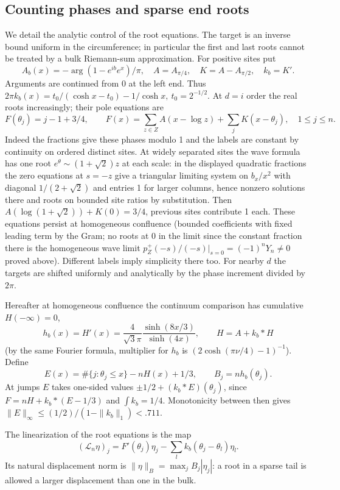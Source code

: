 \documentclass[11pt]{article}
\numberwithin{equation}{section}
\theoremstyle{definition}\newtheorem{definition}[theorem]{Definition}
\theoremstyle{remark}\newtheorem{remark}[theorem]{Remark}
\begin{document}
\subsection{Counting phases and sparse end roots}

We detail the analytic control of the root equations. The target is an inverse bound uniform in the circumference; in particular the first and last roots cannot be treated by a bulk Riemann-sum approximation. For positive sites put
\[
 A_b(x)=-\arg(1-e^{ib}e^x)/\pi,
 \quad A=A_{\pi/4},\quad K=A-A_{\pi/2},\quad k_b=K'.
\]
Arguments are continued from 0 at the left end. Thus
\(2\pi k_b(x)=t_0/(\cosh x-t_0)-1/\cosh x,\ t_0=2^{-1/2}\). At \(d=i\) order the real roots increasingly; their pole equations are
\[
 F(\theta_j)=j-1+3/4,\qquad
 F(x)=\sum_{z\in Z}A(x-\log z)+\sum_j K(x-\theta_j),\quad 1\le j\le n .
\]
Indeed the fractions give these phases modulo 1 and the labels are constant by continuity on ordered distinct sites. At widely separated sites the wave formula has one root \(e^{\theta}\sim(1+\sqrt2)z\) at each scale: in the displayed quadratic fractions the zero equations at \(s=-z\) give a triangular limiting system on \(b_x/x^2\) with diagonal \(1/(2+\sqrt2)\) and entries 1 for larger columns, hence nonzero solutions there and roots on bounded site ratios by substitution. Then \(A(\log(1+\sqrt2))+K(0)=3/4\), previous sites contribute 1 each. These equations persist at homogeneous confluence (bounded coefficients with fixed leading term by the Gram; no roots at 0 in the limit since the constant fraction there is the homogeneous wave limit \(p_Z^+(-s)/(-s)|_{s=0}=(-1)^n Y_n\ne0\) proved above). Different labels imply simplicity there too. For nearby \(d\) the targets are shifted uniformly and analytically by the phase increment divided by \(2\pi\).

Hereafter at homogeneous confluence the continuum comparison has cumulative \(H(-\infty)=0\),
\[
 h_b(x)=H'(x)=\frac{4}{\sqrt3\pi}\frac{\sinh(8x/3)}{\sinh(4x)},\qquad H=A+k_b*H
\]
(by the same Fourier formula, multiplier for \(h_b\) is \((2\cosh(\pi\nu/4)-1)^{-1}\)). Define
\[
 E(x)=\#\{j:\theta_j\le x\}-n H(x)+1/3,\qquad B_j=n h_b(\theta_j).
\]
At jumps \(E\) takes one-sided values \(\pm1/2+(k_b*E)(\theta_j)\), since \(F=nH+k_b*(E-1/3)\) and \(\int k_b=1/4\). Monotonicity between then gives \(\|E\|_\infty\le (1/2)/(1-\|k_b\|_1)<.711\).

The linearization of the root equations is the map
\[
 (\mathcal L_n\eta)_j
   =F'(\theta_j)\eta_j-\sum_l k_b(\theta_j-\theta_l)\eta_l.
\]
Its natural displacement norm is
$\|\eta\|_B=\max_j B_j|\eta_j|$: a root in a sparse tail is allowed
a larger displacement than one in the bulk.
\end{document}
